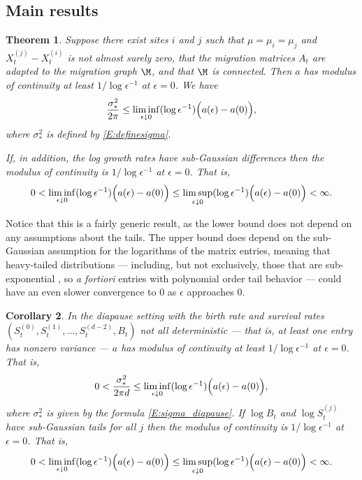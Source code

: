 \documentclass[11pt]{amsart}
\newtheorem{Thm}{Theorem}
\newtheorem{Cor}[Thm]{Corollary}
\begin{document}
\subsection{Main results} \label{sec:mainresult}
\begin{Thm} \label{T:samerate1}
Suppose there exist sites $i$ and $j$ such that $\mu=\mu_i=\mu_j$ and $X^{(j)}_{t}-X^{(i)}_t$ is
not almost surely zero, that the migration matrices $A_t$ are adapted to the migration graph $\M$, and that $\M$ is connected. 
Then $a$ has modulus of continuity at least $1/\log \epsilon^{-1}$ at $\epsilon=0$. We have
\begin{equation} \label{E:logepsMoC0}
\frac{\sigma_*^2}{2\pi} \le \liminf_{\epsilon\downarrow 0} (\log \epsilon^{-1}) \Bigl( a(\epsilon)-a(0) \Bigr),
\end{equation}
where $\sigma_*^2$ is defined by \eqref{E:definesigma}.

If, in addition, the log growth rates have sub-Gaussian differences  then the modulus of
continuity is $1/\log \epsilon^{-1}$ at $\epsilon=0$. That is,
\begin{equation} \label{E:logepsMoC}
0<\liminf_{\epsilon\downarrow 0} (\log \epsilon^{-1}) \Bigl( a(\epsilon)-a(0) \Bigr)
\leq\limsup_{\epsilon\downarrow 0} (\log \epsilon^{-1}) \Bigl( a(\epsilon)-a(0) \Bigr)
<\infty.
\end{equation}
\end{Thm}

Notice that this is a fairly generic result, as the lower bound does not depend
on any assumptions about the tails. 
The upper bound does depend on the sub-Gaussian
assumption for the logarithms of the matrix entries, meaning that heavy-tailed
distributions --- including, but not exclusively, those that are sub-exponential \cite{jT75},
so {\em a fortiori} entries with polynomial order tail behavior --- could have an even
slower convergence to 0 as $\epsilon$ approaches 0.

\begin{Cor} \label{C:diapause}
In the diapause setting with the birth rate and survival rates $(S_t^{(0)}, S_t^{(1)},\dots,S_t^{(d-2)}, B_t)$ not all deterministic --- that is, at least one entry
has nonzero variance ---
$a$ has modulus of continuity at least $1/\log \epsilon^{-1}$ at $\epsilon=0$. That is,
\begin{equation} \label{E:logepsMoCcor0}
0< \frac{\sigma^2_*}{2\pi d} \le \liminf_{\epsilon\downarrow 0} (\log \epsilon^{-1}) \Bigl( a(\epsilon)-a(0) \Bigr) ,
\end{equation}
where $\sigma_*^2$ is given by the formula \eqref{E:sigma_diapause}.
If $\log B_t$ and $\log S_t^{(j)}$ have sub-Gaussian tails for all $j$ then the modulus of
continuity is $1/\log \epsilon^{-1}$ at $\epsilon=0$. That is,
\begin{equation} \label{E:logepsMoCcor}
0<\liminf_{\epsilon\downarrow 0} (\log \epsilon^{-1}) \Bigl( a(\epsilon)-a(0) \Bigr)
\leq\limsup_{\epsilon\downarrow 0} (\log \epsilon^{-1}) \Bigl( a(\epsilon)-a(0) \Bigr)
<\infty.
\end{equation}
\end{Cor}
\end{document}
